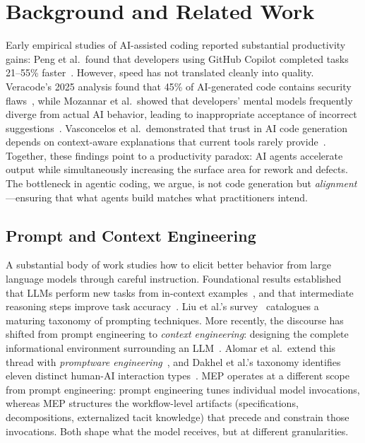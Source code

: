 \section{Background and Related Work}
\label{sec:related}

Early empirical studies of AI-assisted coding reported substantial productivity
gains: Peng et al.\ found that developers using GitHub Copilot completed tasks
21--55\% faster~\cite{peng2023copilot}. However, speed has not translated cleanly
into quality. Veracode's 2025 analysis found that 45\% of AI-generated code
contains security flaws~\cite{veracode2025ai}, while Mozannar et al.\ showed
that developers' mental models frequently diverge from actual AI behavior, leading
to inappropriate acceptance of incorrect suggestions~\cite{developer2023mental}.
Vasconcelos et al.\ demonstrated that trust in AI code generation depends on
context-aware explanations that current tools rarely
provide~\cite{facct2024trust}. Together, these findings point to a productivity paradox:
AI agents accelerate output while simultaneously increasing the surface area for
rework and defects. The bottleneck in agentic coding, we argue, is not code
generation but \emph{alignment}---ensuring that what agents build matches what
practitioners intend.

\subsection{Prompt and Context Engineering}

A substantial body of work studies how to elicit better behavior from
large language models through careful instruction. Foundational results
established that LLMs perform new tasks from in-context
examples~\cite{brown2020gpt3}, and that intermediate reasoning steps
improve task accuracy~\cite{wei2022chain}. Liu et al.'s
survey~\cite{liu2023prompt} catalogues a maturing taxonomy of prompting
techniques. More recently, the discourse has shifted from prompt
engineering to \emph{context engineering}: designing the complete
informational environment surrounding an LLM~\cite{anthropic2025context,
gartner2025context}. Alomar et al.\ extend this thread with
\emph{promptware engineering}~\cite{alomar2025promptware}, and Dakhel
et al.'s taxonomy identifies eleven distinct human-AI interaction
types~\cite{dakhel2025humanai}. MEP operates at a different scope from
prompt engineering: prompt engineering tunes individual model
invocations, whereas MEP structures the workflow-level artifacts
(specifications, decompositions, externalized tacit knowledge) that
precede and constrain those invocations. Both shape what the model
receives, but at different granularities.

